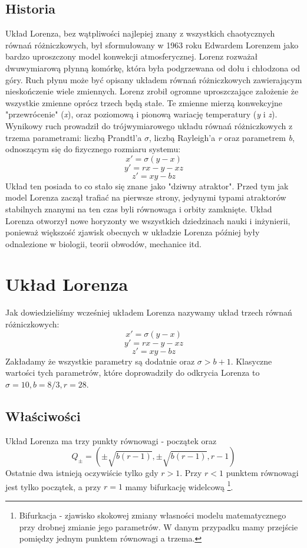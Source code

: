 \documentclass[12pt]{report}
\begin{document}
	\section{Historia}
	\hspace{\parindent} Układ Lorenza, bez wątpliwości najlepiej znany z wszystkich chaotycznych równań różniczkowych, był sformułowany w 1963 roku Edwardem Lorenzem jako bardzo uproszczony model konwekcji atmosferycznej. Lorenz rozważał dwuwymiarową płynną komórkę, która była podgrzewana od dołu i chłodzona od góry. Ruch płynu może być opisany układem równań różniczkowych zawierającym nieskończenie wiele zmiennych. Lorenz zrobił ogromne uproszczające założenie że wszystkie zmienne oprócz trzech będą stałe. Te zmienne mierzą konwekcyjne "przewrócenie" (\textit{x}), oraz poziomową i pionową wariację temperatury (\textit{y} i \textit{z}). Wynikowy ruch  prowadził do trójwymiarowego układu równań różniczkowych z trzema parametrami: liczbą Prandtl'a $\sigma$, liczbą Rayleigh'a \textit{r} oraz parametrem \textit{b}, odnoszącym się do fizycznego rozmiaru systemu:
		\[ x' = \sigma(y - x) \]
		\[ y' = rx - y - xz \]
		\[ z' = xy - bz \]
	\hspace{\parindent} Układ ten posiada to co stało się znane jako "dziwny atraktor". Przed tym jak model Lorenza zaczął trafiać na pierwsze strony, jedynymi typami atraktorów stabilnych znanymi na ten czas byli równowaga i orbity zamknięte. Układ Lorenza otworzył nowe horyzonty we wszystkich dziedzinach nauki i inżynierii, ponieważ większość zjawisk obecnych w układzie Lorenza później były odnalezione w biologii, teorii obwodów, mechanice itd. \cite{HSD}

\chapter{Układ Lorenza}
	\hspace{\parindent} Jak dowiedzieliśmy wcześniej układem Lorenza nazywamy układ trzech równań różniczkowych:
		\[ x' = \sigma(y - x) \]
		\[ y' = rx - y - xz \]
		\[ z' = xy - bz \]
	Zakładamy że wszystkie parametry są dodatnie oraz $\sigma > b + 1$. Klasyczne wartości tych parametrów, które doprowadziły do odkrycia Lorenza to $\sigma = 10, b = 8/3, r = 28$. \cite{L}

	\section{Właściwości}
	\hspace{\parindent} Układ Lorenza ma trzy punkty równowagi - początek oraz
		\[ Q_{\pm} = (\pm \sqrt{b(r-1)}, \pm \sqrt{b(r-1)}, r-1) \]
	Ostatnie dwa istnieją oczywiście tylko gdy $r > 1$. Przy $r < 1$ punktem równowagi jest tylko początek, a przy $r = 1$ mamy bifurkację widelcową \footnote{Bifurkacja - zjawisko skokowej zmiany własności modelu matematycznego przy drobnej zmianie jego parametrów. W danym przypadku mamy przejście pomiędzy jednym punktem równowagi a trzema.}.
	
\end{document}
